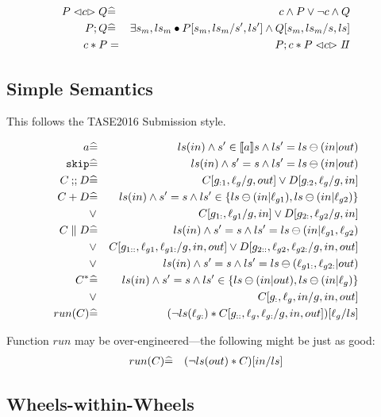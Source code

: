 \begin{eqnarray*}
   P \mathrel{\lhd{c}\rhd} Q
   &\widehat=&
   c \land P \lor \lnot c \land Q
\\ P ; Q 
   &\widehat=&
   \exists s_m,ls_m \bullet P[s_m,ls_m/s',ls'] \land Q[s_m,ls_m/s,ls]
\\ c * P 
   &=&
   P ; c * P \mathrel{\lhd{c}\rhd} I\!I
\end{eqnarray*}

\subsection{Simple Semantics}

This follows the TASE2016 Submission style.

\begin{eqnarray*}
   a 
   &\widehat=& 
   ls(in) \land s' \in [\![{a}]\!] s \land ls'=ls \ominus (in|out)
\\ \texttt{skip} 
   &\widehat=&
   ls(in) \land s' = s \land ls'=ls \ominus (in|out)
\\ C \mathbin{;\!;} D
   &\widehat=&
   C[g_{:1},\ell_g/g,out] \lor D[g_{:2},\ell_g/g,in]
\\ C + D
   &\widehat=&
   ls(in)
   \land s' = s
   \land ls' \in \{ ls \ominus (in|\ell_{g1}), ls \ominus (in|\ell_{g2})\}
\\ &\lor&
   C[g_{1:},\ell_{g1}/g,in] \lor D[g_{2:},\ell_{g2}/g,in]
\\ C \parallel D
   &\widehat=&
   ls(in)
   \land s' = s
   \land ls'= ls \ominus (in|\ell_{g1},\ell_{g2})
\\ &\lor&
   C[g_{1::},\ell_{g1},\ell_{g1:}/g,in,out] 
   \lor D[g_{2::},\ell_{g2},\ell_{g2:}/g,in,out]
\\ &\lor&
   ls(in)
   \land s' = s
   \land ls'= ls \ominus (\ell_{g1:},\ell_{g2:}|out)
\\ C^*
   &\widehat=&
   ls(in)
   \land s' = s
   \land ls' \in \{ ls \ominus (in|out), ls \ominus (in|\ell_g)\}
\\ &\lor&
   C[g_{:},\ell_g,in/g,in,out] 
\\ run(C)
   &\widehat=&
   ( \lnot ls(\ell_{g:})
     *
     C[g_{::},\ell_g,\ell_{g:}/g,in,out]
   )[\ell_g/ls]
\end{eqnarray*}

Function $run$ may be over-engineered---the following might be just as good:
\begin{eqnarray*}
   run(C)
   &\widehat=&
   ( \lnot ls(out) * C)[in/ls]
\end{eqnarray*}

\newpage
\subsection{Wheels-within-Wheels}

